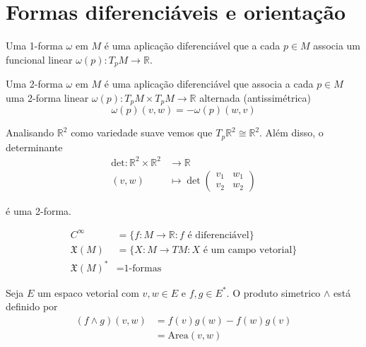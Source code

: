 \section{Formas diferenciáveis e orientação}

\begin{defi}
	Uma 1-forma $\omega$ em $M$ é uma aplicação diferenciável que a cada $p \in M$ associa um funcional linear $\omega(p): T_p M \rightarrow \mathbb{R}$.
\end{defi}

\begin{defi}
	Uma 2-forma $\omega$ em $M$ é uma aplicação diferenciável que associa a cada $p \in M$ uma 2-forma linear $\omega(p): T_p M \times T_p M \rightarrow \mathbb{R}$ alternada (antissimétrica)
	\begin{equation*}
		\omega(p) (v,w) = - \omega(p) (w,v) 
	\end{equation*}
\end{defi}

\begin{exemplo}
	Analisando $\mathbb{R}^2$ como variedade suave vemos que $T_p \mathbb{R}^2 \cong \mathbb{R}^2$. Além disso, o determinante
	\begin{align*}
		\text{det}: \mathbb{R}^2 \times \mathbb{R}^2 &\rightarrow \mathbb{R}\\
		(v,w) & \mapsto \det \left( \begin{matrix}
		v_1 & w_1\\
		v_2 & w_2
		\end{matrix} \right)
	\end{align*}
	
	é uma 2-forma.
\end{exemplo}

\begin{nota}
	\begin{align*}
		C^{\infty} &= \{ f: M \rightarrow \mathbb{R}: f \text{ é diferenciável} \}\\
		\mathfrak{X}(M) &= \{ X: M \rightarrow TM: X \text{ é um campo vetorial} \}\\
		\mathfrak{X}(M)^* &= \text{1-formas}
	\end{align*}
\end{nota}

\begin{defi}
	Seja $E$ um espaco vetorial com $v,w \in E$ e $f,g \in E^*$. O produto simetrico $\wedge$ está definido por
	\begin{align*}
		(f \wedge g) (v,w) &= f(v) g(w) - f(w) g(v)\\
		&= \text{Area}(v,w)
	\end{align*}
\end{defi}

